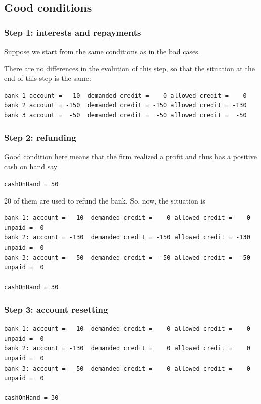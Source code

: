 \documentclass{article}
\begin{document}
\subsection{Good conditions}
	\subsubsection*{Step 1: interests and repayments}
	Suppose we start from the same conditions as in the bad cases.

	There are no differences in the evolution of this step, so that the situation at the end of this step is the same:
\begin{verbatim}
bank 1 account =   10  demanded credit =    0 allowed credit =    0
bank 2 account = -150  demanded credit = -150 allowed credit = -130 
bank 3 account =  -50  demanded credit =  -50 allowed credit =  -50
\end{verbatim}


	\subsubsection*{Step 2: refunding}
	Good condition here means that the firm realized a profit and thus has a positive cash on hand say

	\verb+cashOnHand = 50+

20 of them are used to refund the bank. So, now, the situation is 

\begin{verbatim}
bank 1: account =   10  demanded credit =    0 allowed credit =    0 unpaid =  0
bank 2: account = -130  demanded credit = -150 allowed credit = -130 unpaid =  0
bank 3: account =  -50  demanded credit =  -50 allowed credit =  -50 unpaid =  0

cashOnHand = 30
\end{verbatim}



	\subsubsection*{Step 3: account resetting}

\begin{verbatim}
bank 1: account =   10  demanded credit =    0 allowed credit =    0 unpaid =  0
bank 2: account = -130  demanded credit =    0 allowed credit =    0 unpaid =  0
bank 3: account =  -50  demanded credit =    0 allowed credit =    0 unpaid =  0

cashOnHand = 30
\end{verbatim}
\end{document}
